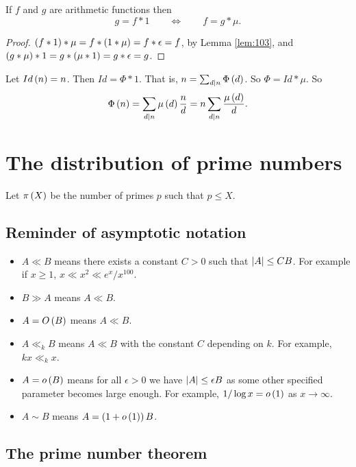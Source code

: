 \begin{proposition}
If $ f $ and $ g $ are arithmetic functions then
$$ g = f * 1 \qquad \iff \qquad f = g * \mu. $$
\end{proposition}

\begin{proof}
$ \left( f * 1 \right) * \mu = f * \left( 1 * \mu \right) = f * \epsilon = f $, by Lemma \ref{lem:103}, and $ \left( g * \mu \right) * 1 = g * \left( \mu * 1 \right) = g * \epsilon = g $.
\end{proof}

\begin{example2}
Let $ Id\left( n \right) = n $. Then $ Id = \Phi * 1 $. That is, $ n = \sum_{d \mid n} \Phi\left( d \right) $. So $ \Phi = Id * \mu $. So
$$ \Phi\left( n \right) = \sum_{d \mid n} \mu\left( d \right)\dfrac{n}{d} = n\sum_{d \mid n} \dfrac{\mu\left( d \right)}{d}. $$
\end{example2}

\pagebreak

\section{The distribution of prime numbers}

Let $ \pi\left( X \right) $ be the number of primes $ p $ such that $ p \le X $.

\subsection{Reminder of asymptotic notation}

\begin{itemize}
\item $ A \ll B $ means there exists a constant $ C > 0 $ such that $ \left\lvert A \right\rvert \le CB $. For example if $ x \ge 1 $, $ x \ll x^2 \ll e^x / x^{100} $.
\item $ B \gg A $ means $ A \ll B $.
\item $ A = O\left( B \right) $ means $ A \ll B $.
\item $ A \ll_k B $ means $ A \ll B $ with the constant $ C $ depending on $ k $. For example, $ kx \ll_k x $.
\item $ A = o\left( B \right) $ means for all $ \epsilon > 0 $ we have $ \left\lvert A \right\rvert \le \epsilon B $ as some other specified parameter becomes large enough. For example, $ 1 / \log x = o\left( 1 \right) $ as $ x \to \infty $.
\item $ A \sim B $ means $ A = \left( 1 + o\left( 1 \right) \right)B $.
\end{itemize}

\subsection{The prime number theorem}

